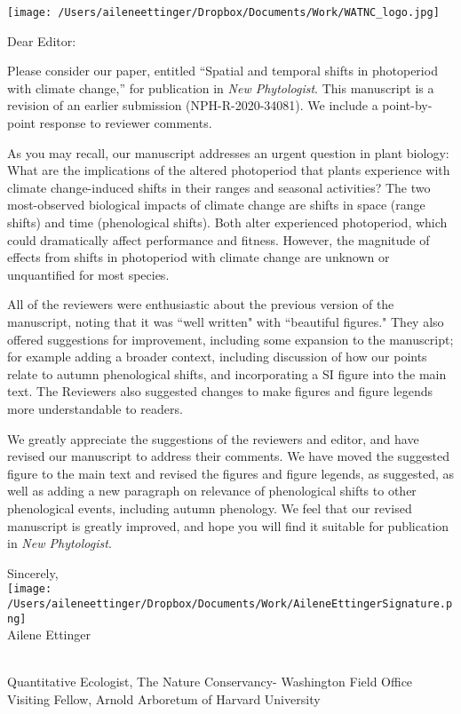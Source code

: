 \documentclass[10.5pt,a4paper]{letter}
\begin{document}
\begin{letter}{}
\texttt{[image: /Users/aileneettinger/Dropbox/Documents/Work/WATNC\_logo.jpg]}

\opening{Dear Editor:}
Please consider our paper, entitled ``Spatial and temporal shifts in photoperiod with climate change,'' for publication in  \emph{New Phytologist}. This manuscript is a revision of an earlier submission (NPH-R-2020-34081). We include a point-by-point response to reviewer comments.

\par As you may recall, our manuscript addresses an urgent question in plant biology: What are the implications
of the altered photoperiod that plants experience with climate change-induced shifts in their ranges and seasonal activities? The two most-observed biological impacts of climate change are shifts in space (range shifts) and time (phenological shifts). Both alter experienced photoperiod, which could dramatically affect performance and fitness. However, the magnitude of effects from shifts in photoperiod with climate change are unknown or unquantified for most species. 

\par All of the reviewers were enthusiastic about the previous version of the manuscript, noting that it was ``well written" with ``beautiful figures." They also offered suggestions for improvement, including some expansion to the manuscript; for example adding a broader context, including discussion of how our points relate to autumn phenological shifts, and incorporating a SI figure into the main text. The Reviewers also suggested changes to make figures and figure legends more understandable to readers. 
\par We greatly appreciate the suggestions of the reviewers and editor, and have revised our manuscript to address their comments. We have moved the suggested figure to the main text and revised the figures and figure legends, as suggested, as well as adding a new paragraph on relevance of phenological shifts to other phenological events, including autumn phenology. We feel that our revised manuscript is greatly improved, and hope you will find it suitable for publication in \emph{New Phytologist}.

\par Sincerely,\\

\texttt{[image: /Users/aileneettinger/Dropbox/Documents/Work/AileneEttingerSignature.png]} \\
Ailene Ettinger
\begin{footnotesize}\\
Quantitative Ecologist, The Nature Conservancy- Washington Field Office\\
Visiting Fellow, Arnold Arboretum of Harvard University 
\end{footnotesize}


\end{letter}
\end{document}
